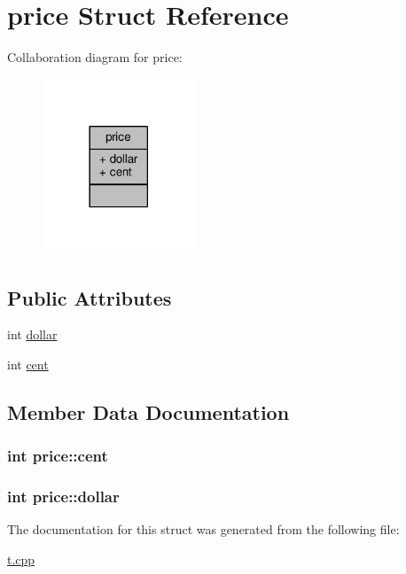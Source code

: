 \hypertarget{structprice}{}\section{price Struct Reference}
\label{structprice}


Collaboration diagram for price\+:
\nopagebreak
\begin{figure}[H]
\begin{center}
\leavevmode
\includegraphics[width=129pt]{structprice__coll__graph}
\end{center}
\end{figure}
\subsection*{Public Attributes}
\begin{DoxyCompactItemize}
\item 
int \hyperlink{structprice_a0e896a2991e2886400502d4f8e5832fc}{dollar}
\item 
int \hyperlink{structprice_a79be97486cb903560bad96132f373907}{cent}
\end{DoxyCompactItemize}


\subsection{Member Data Documentation}
\subsubsection[{\texorpdfstring{cent}{cent}}]{\setlength{\rightskip}{0pt plus 5cm}int price\+::cent}\hypertarget{structprice_a79be97486cb903560bad96132f373907}{}\label{structprice_a79be97486cb903560bad96132f373907}
\subsubsection[{\texorpdfstring{dollar}{dollar}}]{\setlength{\rightskip}{0pt plus 5cm}int price\+::dollar}\hypertarget{structprice_a0e896a2991e2886400502d4f8e5832fc}{}\label{structprice_a0e896a2991e2886400502d4f8e5832fc}


The documentation for this struct was generated from the following file\+:\begin{DoxyCompactItemize}
\item 
\hyperlink{t_8cpp}{t.\+cpp}\end{DoxyCompactItemize}
